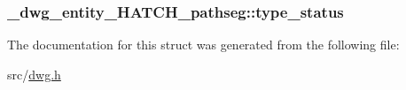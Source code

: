 \hypertarget{struct__dwg__entity__HATCH__pathseg_a3414788035e6168de4feac0cba4af4d4}{
\subsubsection[{type\-\_\-status}]{ {\bf \-\_\-dwg\-\_\-entity\-\_\-\-H\-A\-T\-C\-H\-\_\-pathseg\-::type\-\_\-status}}}\label{struct__dwg__entity__HATCH__pathseg_a3414788035e6168de4feac0cba4af4d4}


\-The documentation for this struct was generated from the following file\-:\begin{DoxyCompactItemize}
\item 
src/\hyperlink{dwg_8h}{dwg.\-h}\end{DoxyCompactItemize}
